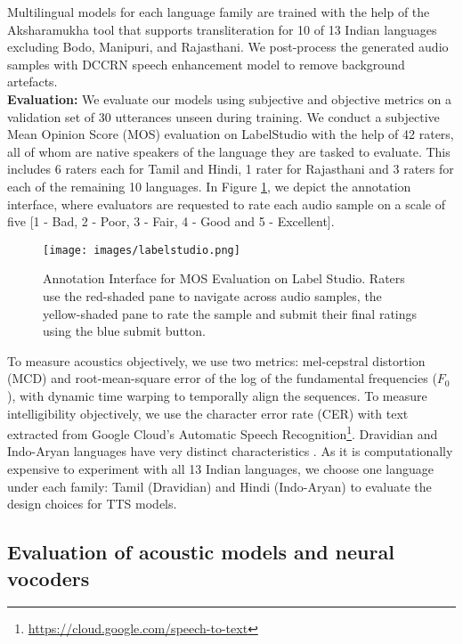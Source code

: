 \documentclass{article}
\begin{document}
Multilingual models for each language family are trained with the help of the Aksharamukha tool that supports transliteration for 10 of 13 Indian languages excluding Bodo, Manipuri, and Rajasthani. 
We post-process the generated audio samples with DCCRN \cite{hu2020dccrn} speech enhancement model to remove background artefacts.
\\
\textbf{Evaluation:}  We evaluate our models using subjective and objective metrics on a validation set of 30 utterances unseen during training. We conduct a subjective Mean Opinion Score (MOS) evaluation on LabelStudio \cite{label-studio} with the help of 42 raters, all of whom are native speakers of the language they are tasked to evaluate. This includes 6 raters each for Tamil and Hindi, 1 rater for Rajasthani and 3 raters for each of the remaining 10 languages. In Figure \ref{fig:labelstudio}, we depict the annotation interface, where evaluators are requested to rate each audio sample on a scale of five [1 - Bad, 2 - Poor, 3 - Fair, 4 - Good and 5 - Excellent]. 



\begin{figure}[htp]
    \centering
    \texttt{[image: images/labelstudio.png]}
    \caption{Annotation Interface for MOS Evaluation on Label Studio. Raters use the red-shaded pane to navigate across audio samples, the yellow-shaded pane to rate the sample and submit their final ratings using the blue submit button.}
    \label{fig:labelstudio}
\end{figure}

To measure acoustics objectively, we use two metrics: mel-cepstral distortion (MCD) \cite{kubichek1993mel} and root-mean-square error of the log of the fundamental frequencies ($F_0$), with dynamic time warping \cite{salvador2007toward} to temporally align the sequences. To measure intelligibility objectively, we use the character error rate (CER) with text extracted from Google Cloud's Automatic Speech Recognition\footnote{\scriptsize \url{https://cloud.google.com/speech-to-text}}. Dravidian and Indo-Aryan languages have very distinct characteristics \cite{prakash2020generic}.
As it is computationally expensive to experiment with all 13 Indian languages, we choose one language under each family: Tamil (Dravidian) and Hindi (Indo-Aryan) to evaluate the design choices for TTS models. 





\subsection{Evaluation of acoustic models and neural vocoders} \label{subsec:combinations}
\end{document}
